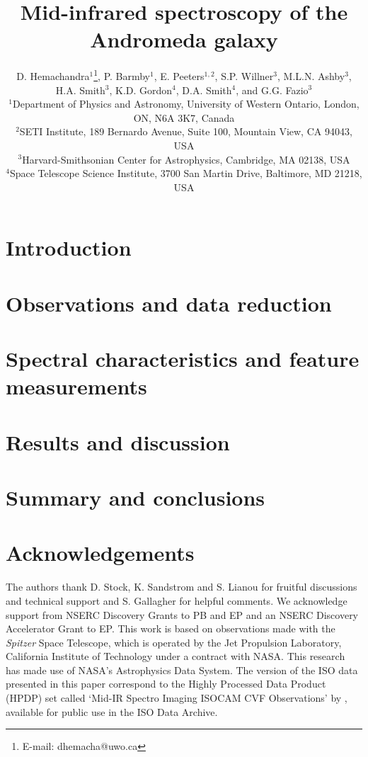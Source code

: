 \documentclass[useAMS,usenatbib,a4paper]{mn2e}
\title[Mid-infrared spectroscopy of M31]{Mid-infrared spectroscopy of the Andromeda galaxy}
\author[D. Hemachandra et al.]
{D. Hemachandra$^{1}$\thanks{E-mail: dhemacha@uwo.ca},
P. Barmby$^{1}$, 
E. Peeters$^{1,2}$, 
S.P. Willner$^{3}$, 
M.L.N. Ashby$^{3}$,
H.A. Smith$^{3}$, 
\newauthor 
K.D. Gordon$^{4}$,
D.A. Smith$^{4}$,
and
G.G. Fazio$^{3}$\\
$^{1}$Department of Physics and Astronomy, University of Western Ontario, London, ON, N6A 3K7, Canada\\
$^{2}$SETI Institute, 189 Bernardo Avenue, Suite 100, Mountain View, CA 94043, USA\\
$^{3}$Harvard-Smithsonian Center for Astrophysics, Cambridge, MA 02138, USA\\
$^{4}$Space Telescope Science Institute, 3700 San Martin Drive, Baltimore, MD 21218, USA
}
\begin{document}
\date{}

\maketitle

\label{firstpage}



\section{Introduction}



\section{Observations and data reduction}



\section{Spectral characteristics and feature measurements}
\label{sect:data_analysis}



\section{Results and discussion}





\section{Summary and conclusions}



\section*{Acknowledgements}

The authors thank D. Stock, K. Sandstrom and S. Lianou for fruitful discussions and technical support
and S. Gallagher for helpful comments.
We acknowledge support from NSERC Discovery Grants to PB and EP and an NSERC Discovery Accelerator Grant to EP. 
This work is based on observations made with the {\em Spitzer} Space Telescope, which is operated by the 
Jet Propulsion Laboratory, California Institute of Technology under a contract with NASA.
This research has made use of NASA's Astrophysics Data System.
The version of the ISO data presented in this paper correspond to the Highly Processed Data Product (HPDP) set called `Mid-IR Spectro Imaging ISOCAM CVF Observations'
by \citet{Boulanger_F_2005}, available for public use in the ISO Data Archive.



{}

\bsp

\label{lastpage}
\end{document}
